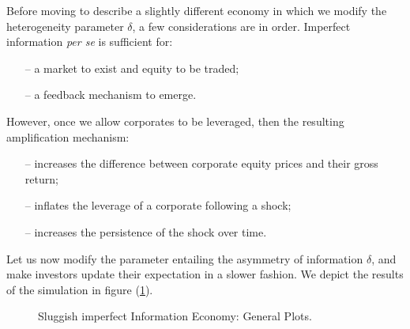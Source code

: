 \documentclass[11pt]{article}
\begin{document}
Before moving to describe a slightly different economy in which we modify the heterogeneity parameter $\delta$, a few considerations are in order. Imperfect information \emph{per se} is sufficient for:
\begin{itemize}
	\item[--] a market to exist and equity to be traded;
	\item[--] a feedback mechanism to emerge.
\end{itemize}
However, once we allow corporates to be leveraged, then the resulting amplification mechanism:
\begin{itemize}
	\item[--] increases the difference between corporate equity prices and their gross return;
	\item[--] inflates the leverage of a corporate following a shock;
	\item[--] increases the persistence of the shock over time.
\end{itemize}
Let us now modify the parameter entailing the asymmetry of information $\delta$, and make investors update their expectation in a slower fashion. We depict the results of the simulation in figure (\ref{figure6}).
\begin{figure}[h!]
\centering
{}\quad
{}
 \caption{Sluggish imperfect Information Economy: General Plots.} \label{figure6}
\end{figure}\\
\end{document}
